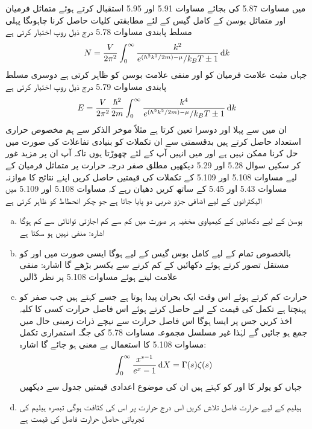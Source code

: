 میں مساوات 5.87 کی بجائے مساوات 5.91 اور 5.95 استقبال کرتے ہوئے متماثل فرمیان اور متماثل بوسن کے کامل گیس کے لئے مطابقتی کلیات حاصل کرنا چاہوںگا پہلی مسلط پابندی مساوات 5.78 درج ذیل روپ اختیار کرتی ہے 
\begin{align}
N = \frac{V}{2 \pi^2} \int_0^{\infty} \frac{k^2}{e^{(h^2 k^2 /2m) - \mu} / k_B T \pm 1} \dif k
\end{align}
جہاں مثبت علامت فرمیان کو اور منفی علامت بوسن کو ظاہر  کرتی ہے دوسری مسلط پابندی مساوات 5.79 درج ذیل روپ اختیار کرتی ہے 
\begin{align}
E = \frac{V}{2\pi^2} \frac{\hslash^2}{2m} \int_0^{\infty} \frac{k^4}{e^{(h^2 k^2 /2m) - \mu} / k_B T \pm 1} \dif k
\end{align}
ان میں سے پہلا  اور دوسرا  تعین کرتا ہے مثلاً موخر الذکر سے ہم مخصوص حراری استعداد  حاصل کرتے ہیں بدقسمتی سے ان  تکملات کو بنیادی تفاعلات کی صورت میں حل کرنا ممکن نہیں ہے اور میں انہیں آپ کے لئے چھوڑتا ہوں تاکہ آپ ان پر مزید غور کر سکیں سوال 5.28 اور 5.29 دیکھیں 
مطلق صفر درجہ حرارت پر متماثل فرميان کے لیے مساوات 5.108 اور 5.109 کے تکملات کی قیمتیں حاصل کریں اپنے نتائج کا موازنہ مساوات 5.43 اور 5.45 کے ساتھ کریں دھیان رہے کہ مساوات 5.108 اور 5.109 میں الیکٹرانوں کے لیے اضافی جزو ضربی دو  پایا جاتا ہے جو چکر انحطاط کو ظاہر کرتی ہے 
\begin{enumerate}[a.]
\item
بوسن کے لیے دکھائیں کے کیمیاوی مخفیہ ہر صورت میں کم سے کم اجازتی توانائی سے کم ہوگا اشارہ:  منفی نہیں ہو سکتا ہے 
\item
بالخصوص تمام  کے لیے کامل بوس گیس کے لیے  ہوگا ایسی صورت میں  اور  کو مستقل تصور کرتے ہوئے دکھائیں کے  کم کرنے سے  یکسر بڑھے گا اشارہ: منفی علامت لیتے ہوئے مساوات 5.108 پر نظر ڈالیں
\item
حرارت  کم کرتے ہوئے اس وقت ایک بحران پیدا ہوتا ہے جسے    کہتے ہیں جب  صفر کو پہنچتا ہے تکمل کی قیمت  کے لیے حاصل کرتے ہوئے اس فاصل حرارت کسی کا کلیہ اخذ کریں جس پر ایسا ہوگا اس فاصل حرارت سے نیچے ذرات زمینی حال میں جمع ہو جائیں گے لہٰذا غیر مسلسل مجموعہ مساوات 5.78 کی جگہ استمراری تکمل مساوات 5.108 کا استعمال بے معنی ہو جائے گا اشارہ: 
\begin{align} 
\int_0^{\infty} \frac{x^{s - 1}}{e^x - 1} \dif X = \Gamma (s) \zeta(s)
\end{align} 
جہاں  کو  یولر  کا   اور  کو    کہتے ہیں ان کی موضوع اعدادی قیمتیں  جدول سے دیکھیں 
\item
ہیلیم کے لیے حرارت فاصل تلاش کریں اس درج حرارت پر اس کی کثافت  ہوگی تبصرہ ہیلیم کی تجرباتی حاصل حرارت فاصل کی قیمت  ہے 
\end{enumerate}

